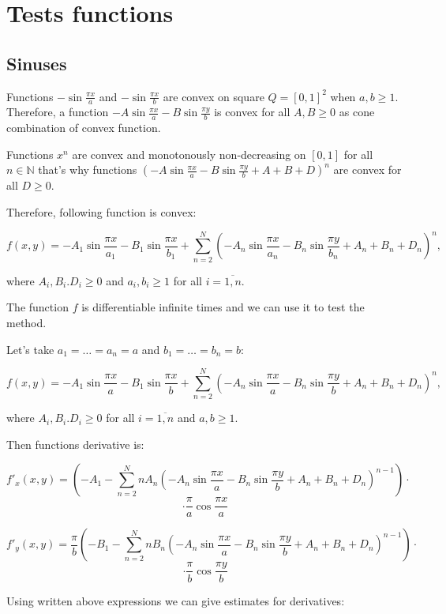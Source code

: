 \documentclass[12pt]{article}
\begin{document}
\section{Tests functions}

\subsection{Sinuses}
Functions $-\sin\frac{\pi x}{a}$ and $-\sin\frac{\pi x}{b}$ are convex on square $Q = [0,1]^2$ when $a,b\geq 1$. Therefore, a function $-A\sin\frac{\pi x}{a} - B\sin\frac{\pi y}{b}$ is convex for all $A,B\geq 0$ as cone combination of convex function.

Functions $x^n$ are convex and monotonously non-decreasing on $[0, 1]$ for all $n \in \mathbb{N}$ that's why functions $\left(-A\sin\frac{\pi x}{a} - B\sin\frac{\pi y}{b} + A + B + D\right)^n$ are convex for all $D\geq 0$.

Therefore, following function is convex:

$$f(x,y) = -A_1\sin\frac{\pi x}{a_1} - B_1\sin\frac{\pi x}{b_1} + \sum\limits_{n=2}^N\left(-A_n\sin\frac{\pi x}{a_n} - B_n\sin\frac{\pi y}{b_n} + A_n + B_n + D_n\right)^n,$$

where $A_i, B_i. D_i\geq 0$ and $a_i, b_i \geq 1$ for all $i = \overline{1, n}$.

The function $f$ is differentiable infinite times and we can use it to test the method.

Let's take $a_1 = \dots = a_n = a$ and $b_1 = \dots = b_n = b$:

$$f(x,y) = -A_1\sin\frac{\pi x}{a} - B_1\sin\frac{\pi x}{b} + \sum\limits_{n=2}^N\left(-A_n\sin\frac{\pi x}{a} - B_n\sin\frac{\pi y}{b} + A_n + B_n + D_n\right)^n,$$

where $A_i, B_i. D_i\geq 0$ for all $i = \overline{1, n}$ and $a, b \geq 1$.

Then functions derivative is:

$$f'_x(x,y) = \left(-A_1 - \sum\limits_{n=2}^NnA_n\left(-A_n\sin\frac{\pi x}{a} - B_n\sin\frac{\pi y}{b} + A_n + B_n + D_n\right)^{n-1}\right)\cdot$$
$$\cdot\frac{\pi}{a}\cos \frac{\pi x}{a}$$

$$f'_y(x,y) = \frac{\pi}{b}\left(-B_1 - \sum\limits_{n=2}^NnB_n\left(-A_n\sin\frac{\pi x}{a} - B_n\sin\frac{\pi y}{b} + A_n + B_n + D_n\right)^{n-1}\right)\cdot$$
$$\cdot\frac{\pi}{b}\cos \frac{\pi y}{b}$$

Using written above expressions we can give estimates for derivatives:
\end{document}
